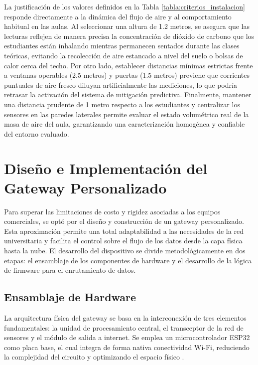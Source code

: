 La justificación de los valores definidos en la Tabla \ref{tabla:criterios_instalacion} responde directamente a la dinámica del flujo de aire y al comportamiento habitual en las aulas. Al seleccionar una altura de 1.2 metros, se asegura que las lecturas reflejen de manera precisa la concentración de dióxido de carbono que los estudiantes están inhalando mientras permanecen sentados durante las clases teóricas, evitando la recolección de aire estancado a nivel del suelo o bolsas de calor cerca del techo. Por otro lado, establecer distancias mínimas estrictas frente a ventanas operables (2.5 metros) y puertas (1.5 metros) previene que corrientes puntuales de aire fresco diluyan artificialmente las mediciones, lo que podría retrasar la activación del sistema de mitigación predictiva. Finalmente, mantener una distancia prudente de 1 metro respecto a los estudiantes y centralizar los sensores en las paredes laterales permite evaluar el estado volumétrico real de la masa de aire del aula, garantizando una caracterización homogénea y confiable del entorno evaluado.

\newpage
\section{Diseño e Implementación del Gateway Personalizado}

Para superar las limitaciones de costo y rigidez asociadas a los equipos comerciales, se optó por el diseño y construcción de un gateway personalizado. Esta aproximación permite una total adaptabilidad a las necesidades de la red universitaria y facilita el control sobre el flujo de los datos desde la capa física hasta la nube. El desarrollo del dispositivo se divide metodológicamente en dos etapas: el ensamblaje de los componentes de hardware y el desarrollo de la lógica de firmware para el enrutamiento de datos.

\subsection{Ensamblaje de Hardware}

La arquitectura física del gateway se basa en la interconexión de tres elementos fundamentales: la unidad de procesamiento central, el transceptor de la red de sensores y el módulo de salida a internet. Se emplea un microcontrolador ESP32 como placa base, el cual integra de forma nativa conectividad Wi-Fi, reduciendo la complejidad del circuito y optimizando el espacio físico \cite{nb_mcu_4}.

